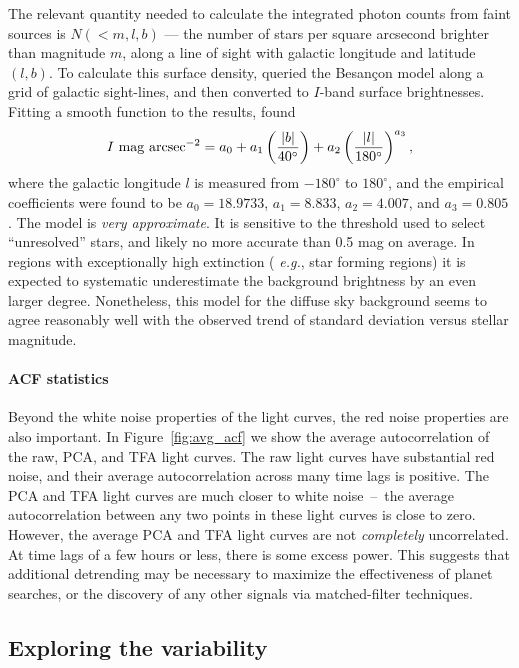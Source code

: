 \documentclass[12pt,twocolumn,tighten]{aastex62}
\begin{document}
The relevant quantity needed to calculate the integrated photon counts
from faint sources is  $N(<m,l,b)$ --- the number of stars per square
arcsecond brighter than magnitude $m$, along a line of sight with
galactic longitude and latitude $(l,b)$.  To calculate this surface
density, \citet{winn_background_2013} queried the Besan\c con model
\citep{robin_synthetic_2003}  along a grid of galactic sight-lines,
and then converted to $I$-band surface brightnesses.  Fitting a smooth
function to the results, \citet{winn_background_2013} found
\begin{equation}
  I\ {\rm mag\ arcsec}^{-2} =
      a_0 + a_1 \left(\frac{|b|}{40^\circ}\right)
      + a_2 \left(\frac{|l|}{180^\circ}\right)^{a_3},
\end{equation}
where the galactic longitude $l$ is measured from $-180^\circ$ to
$180^\circ$, and the empirical coefficients were found to be $a_0 =
18.9733$, $a_1=8.833$, $a_2=4.007$, and $a_3=0.805$.  The model is
{\it very approximate}.  It is sensitive to the threshold used to
select ``unresolved'' stars, and likely no more accurate than 0.5 mag
on average.  In regions with exceptionally high extinction ({\it
e.g.}, star forming regions) it is expected to systematic
underestimate the background brightness by an even larger degree.
Nonetheless, this model for the diffuse sky background seems to agree
reasonably well with the observed trend of standard deviation versus
stellar magnitude.


\paragraph{ACF statistics}

Beyond the white noise properties of the light curves, the red noise
properties are also important.  In Figure~\ref{fig:avg_acf} we show
the average autocorrelation of the raw, PCA, and TFA light curves.
The raw light curves have substantial red noise, and their average
autocorrelation across many time lags is positive.  The PCA and TFA
light curves are much closer to white noise~--~the average
autocorrelation between any two points in these light curves is close
to zero.  However, the average PCA and TFA light curves are not {\it
completely} uncorrelated.  At time lags of a few hours or less, there
is some excess power.  This suggests that additional detrending may be
necessary to maximize the effectiveness of planet searches, or the
discovery of any other signals via matched-filter techniques.


\subsection{Exploring the variability}
\label{subsec:identifying_variability}
\end{document}

